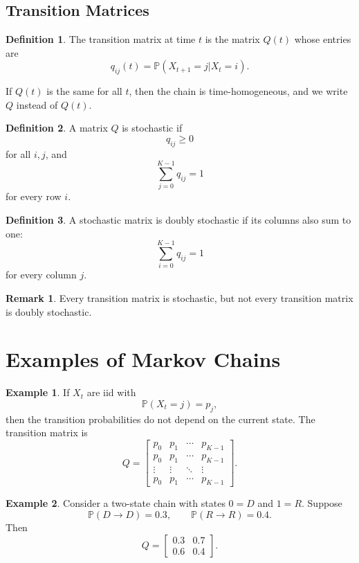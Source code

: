 \documentclass[12pt,oneside]{book}
\numberwithin{equation}{section}
\theoremstyle{definition}
\newtheorem{definition}{Definition}[section]
\newtheorem{example}{Example}[section]
\newtheorem{remark}{Remark}[section]
\theoremstyle{plain}
\theoremstyle{remark}
\newcommand{\Prob}{\mathbb{P}}
\begin{document}
\subsection{Transition Matrices}

\begin{definition}
The transition matrix at time $t$ is the matrix $Q(t)$ whose entries are
\[
q_{ij}(t)=\Prob(X_{t+1}=j|X_t=i).
\]
\end{definition}

If $Q(t)$ is the same for all $t$, then the chain is time-homogeneous, and we write $Q$ instead of $Q(t)$.

\begin{definition}
A matrix $Q$ is stochastic if
\[
q_{ij}\ge 0
\]
for all $i,j$, and
\[
\sum_{j=0}^{K-1}q_{ij}=1
\]
for every row $i$.
\end{definition}

\begin{definition}
A stochastic matrix is doubly stochastic if its columns also sum to one:
\[
\sum_{i=0}^{K-1}q_{ij}=1
\]
for every column $j$.
\end{definition}

\begin{remark}
Every transition matrix is stochastic, but not every transition matrix is doubly stochastic.
\end{remark}

\section{Examples of Markov Chains}

\begin{example}
If $X_t$ are iid with
\[
\Prob(X_t=j)=p_j,
\]
then the transition probabilities do not depend on the current state. The transition matrix is
\[
Q=
\begin{bmatrix}
p_0 & p_1 & \cdots & p_{K-1}\\
p_0 & p_1 & \cdots & p_{K-1}\\
\vdots & \vdots & \ddots & \vdots\\
p_0 & p_1 & \cdots & p_{K-1}
\end{bmatrix}.
\]
\end{example}

\begin{example}
Consider a two-state chain with states $0=D$ and $1=R$. Suppose
\[
\Prob(D\to D)=0.3,
\qquad
\Prob(R\to R)=0.4.
\]
Then
\[
Q=
\begin{bmatrix}
0.3 & 0.7\\
0.6 & 0.4
\end{bmatrix}.
\]
\end{example}
\end{document}
